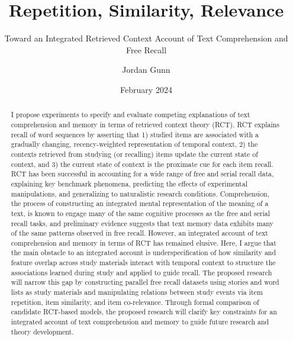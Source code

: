 \documentclass[
  english,
  11pt,
  letterpaper,
]{article}
\title{Repetition, Similarity, Relevance}
\subtitle{Toward an Integrated Retrieved Context Account of Text
Comprehension and Free Recall}
\author{Jordan Gunn}
\date{February 2024}
\begin{document}
\maketitle
\begin{abstract}
I propose experiments to specify and evaluate competing explanations of
text comprehension and memory in terms of retrieved context theory
(RCT). RCT explains recall of word sequences by asserting that 1)
studied items are associated with a gradually changing, recency-weighted
representation of temporal context, 2) the contexts retrieved from
studying (or recalling) items update the current state of context, and
3) the current state of context is the proximate cue for each item
recall. RCT has been successful in accounting for a wide range of free
and serial recall data, explaining key benchmark phenomena, predicting
the effects of experimental manipulations, and generalizing to
naturalistic research conditions. Comprehension, the process of
constructing an integrated mental representation of the meaning of a
text, is known to engage many of the same cognitive processes as the
free and serial recall tasks, and preliminary evidence suggests that
text memory data exhibits many of the same patterns observed in free
recall. However, an integrated account of text comprehension and memory
in terms of RCT has remained elusive. Here, I argue that the main
obstacle to an integrated account is underspecification of how
similarity and feature overlap across study materials interact with
temporal context to structure the associations learned during study and
applied to guide recall. The proposed research will narrow this gap by
constructing parallel free recall datasets using stories and word lists
as study materials and manipulating relations between study events via
item repetition, item similarity, and item co-relevance. Through formal
comparison of candidate RCT-based models, the proposed research will
clarify key constraints for an integrated account of text comprehension
and memory to guide future research and theory development.
\end{abstract}
\end{document}

